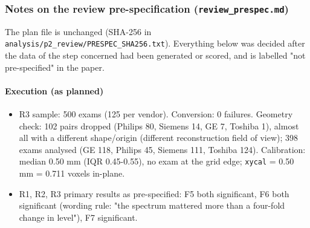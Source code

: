 \subsubsection*{Notes on the review pre-specification (\texttt{review\_prespec.md})}
The plan file is unchanged (SHA-256 in \texttt{analysis/p2\_review/PRESPEC\_SHA256.txt}). Everything below was decided after the data of the step concerned had been generated or scored, and is labelled "not pre-specified" in the paper.

\paragraph*{Execution (as planned)}
\begin{itemize}
\item R3 sample: 500 exams (125 per vendor). Conversion: 0 failures. Geometry check: 102 pairs dropped (Philips 80, Siemens 14, GE 7, Toshiba 1), almost all with a different shape/origin (different reconstruction field of view); 398 exams analysed (GE 118, Philips 45, Siemens 111, Toshiba 124). Calibration: median 0.50 mm (IQR 0.45-0.55), no exam at the grid edge; \texttt{xycal} = 0.50 mm = 0.711 voxels in-plane.
\item R1, R2, R3 primary results as pre-specified: F5 both significant, F6 both significant (wording rule: "the spectrum mattered more than a four-fold change in level"), F7 significant.
\end{itemize}

